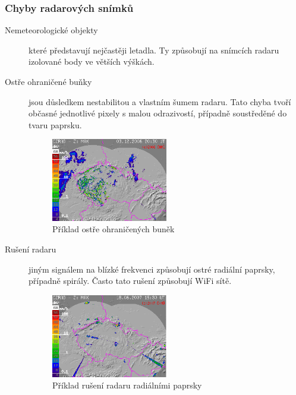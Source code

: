 \documentclass[a4paper,12pt]{article}
\begin{document}
\subsubsection*{Chyby radarových snímků}
\begin{description}
\item[Nemeteorologické objekty] které představují nejčastěji letadla. Ty způsobují na snímcích radaru izolované body ve větších výškách.

\item[Ostře ohraničené buňky] jsou důsledkem nestabilitou a vlastním šumem radaru. Tato chyba tvoří občasné jednotlivé pixely s malou odrazivostí, případně soustředěné do tvaru paprsku.
\begin{figure}[h!]
    \centering
    \includegraphics[width=0.5\textwidth]{./img/srazky/0612032030-gif.png}
    \caption[Ostře ohraničené buňky]{\centering Příklad ostře ohraničených buněk  \footnotemark}
\end{figure}

\item[Rušení radaru] jiným signálem na blízké frekvenci způsobují ostré radiální paprsky, případně spirály. Často tato rušení způsobují WiFi sítě.

\begin{figure}[h!]
    \centering
    \includegraphics[width=0.5\textwidth]{./img/srazky/0706181530-gif.png}
    \caption[Rušení radaru]{\centering Příklad rušení radaru radiálními paprsky \footnotemark }
\end{figure}





\end{description}
\end{document}
